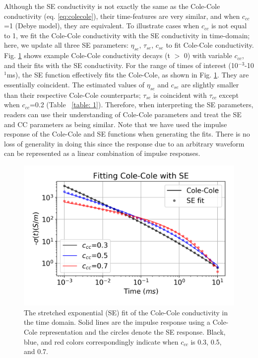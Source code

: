 \documentclass[manuscript]{geophysics}
\begin{document}
Although the SE conductivity is not exactly the same as the Cole-Cole conductivity (eq. \ref{eq:colecole}), their time-features are very similar, and when $c_{cc}$=1 (Debye model), they are equivalent.
To illustrate cases when $c_{cc}$ is not equal to 1, we fit the Cole-Cole conductivity with the SE conductivity in time-domain; here, we update all three SE parameters: $\eta_{se}$, $\tau_{se}$, $c_{se}$ to fit Cole-Cole conductivity. Fig. \ref{fig:1} shows example Cole-Cole conductivity decays (t $>$ 0) with variable $c_{cc}$, and their fits with the SE conductivity.
For the range of times of interest (10$^{-3}$-10$^{1}$ms), the SE function effectively fits the Cole-Cole, as shown in Fig. \ref{fig:1}. They are essentially coincident. The estimated values of $\eta_{se}$ and $c_{se}$ are slightly smaller than their respective Cole-Cole counterparts; $\tau_{se}$ is coincident with $\tau_{cc}$ except when $c_{cc}$=0.2 (Table ~\ref{table: 1}). Therefore, when interpreting the SE parameters, readers can use their understanding of Cole-Cole parameters and treat the SE and CC parameters as being similar.
Note that we have used the impulse response of the Cole-Cole and SE functions when generating the fits. There is no loss of generality in doing this since the response due to an arbitrary waveform can be represented as a linear combination of impulse responses.
\begin{figure}[htb]
  \centering
  \includegraphics[width=1.0\textwidth]{figures/se_curves.png}
  \caption{The stretched exponential (SE) fit of the Cole-Cole conductivity in the time domain. Solid lines are the impulse response using a Cole-Cole representation and the circles denote the SE response. Black, blue, and red colors correspondingly indicate when $c_{cc}$ is 0.3, 0.5, and 0.7.}
  \label{fig:1}
\end{figure}
\end{document}
